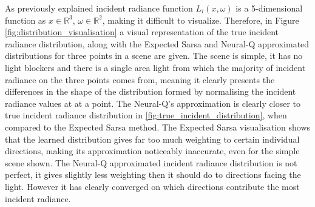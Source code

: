 \documentclass[../dissertation.tex]{subfiles}
\begin{document}
As previously explained incident radiance function $L_i(x, \omega)$ is a 5-dimensional function as $x \in \mathbb{R}^3$, $\omega \in \mathbb{R}^2$, making it difficult to visualize. Therefore, in Figure \ref{fig:distribution_visualisation} a visual representation of the true incident radiance distribution, along with the Expected Sarsa and Neural-Q approximated distributions for three points in a scene are given. The scene is simple, it has no light blockers and there is a single area light from which the majority of incident radiance on the three points comes from, meaning it clearly presents the differences in the shape of the distribution formed by normalising the incident radiance values at at a point. The Neural-Q's approximation is clearly closer to true incident radiance distribution in \ref{fig:true_incident_distribution}, when compared to the Expected Sarsa method. The Expected Sarsa visualisation shows that the learned distribution gives far too much weighting to certain individual directions, making its approximation noticeably inaccurate, even for the simple scene shown. The Neural-Q approximated incident radiance distribution is not perfect, it gives slightly less weighting then it should do to directions facing the light. However it has clearly converged on which directions contribute the most incident radiance.
\end{document}
